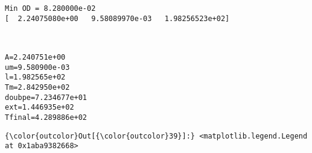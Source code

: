 \documentclass[11pt]{article}
\begin{document}
    \begin{Verbatim}[commandchars=\\\{\}]
Min OD = 8.280000e-02
[  2.24075080e+00   9.58089970e-03   1.98256523e+02]

    \end{Verbatim}

    \begin{center}
    \end{center}
    { \hspace*{\fill} \\}
    
    \begin{Verbatim}[commandchars=\\\{\}]
A=2.240751e+00
um=9.580900e-03
l=1.982565e+02
Tm=2.842950e+02
doubpe=7.234677e+01
ext=1.446935e+02
Tfinal=4.289886e+02

    \end{Verbatim}

            \begin{Verbatim}[commandchars=\\\{\}]
{\color{outcolor}Out[{\color{outcolor}39}]:} <matplotlib.legend.Legend at 0x1aba9382668>
\end{Verbatim}
        
    \begin{center}
    \end{center}
    { \hspace*{\fill} \\}
    
    \begin{center}
    \end{center}
    { \hspace*{\fill} \\}
    
\end{document}
